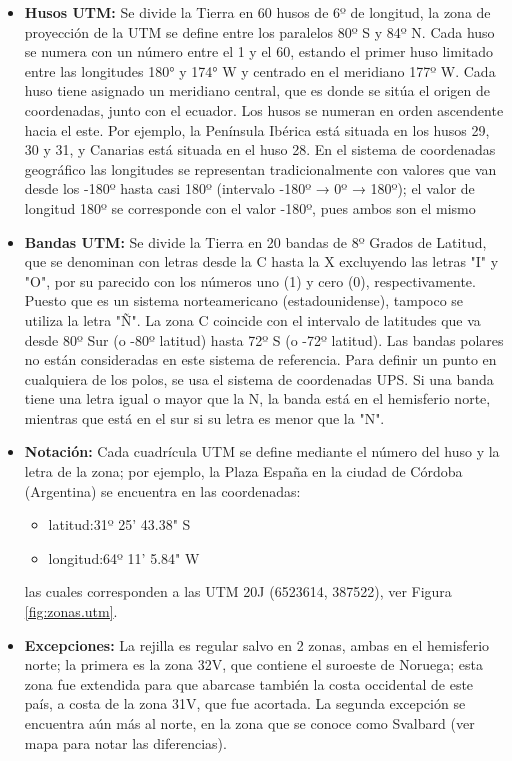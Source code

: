\documentclass[a4paper,12pt,twoside]{article}
\begin{document}
\begin{itemize}
	\item \textbf{  Husos UTM:}  Se divide la Tierra en 60 husos de 6º de longitud, la zona de
  proyección de la UTM se define entre los paralelos 80º S y 84º
  N. Cada huso se numera con un número entre el 1 y el 60, estando el
  primer huso limitado entre las longitudes 180° y 174° W y centrado
  en el meridiano 177º W. Cada huso tiene asignado un meridiano
  central, que es donde se sitúa el origen de coordenadas, junto con
  el ecuador. Los husos se numeran en orden ascendente hacia el
  este. Por ejemplo, la Península Ibérica está situada en los husos
  29, 30 y 31, y Canarias está situada en el huso 28. En el sistema de
  coordenadas geográfico las longitudes se representan
  tradicionalmente con valores que van desde los -180º hasta casi 180º
  (intervalo -180º → 0º → 180º); el valor de longitud 180º se
  corresponde con el valor -180º, pues ambos son el mismo

\item \textbf{Bandas UTM:}  Se divide la Tierra en 20 bandas de 8º Grados de Latitud, que se
  denominan con letras desde la C hasta la X excluyendo las letras "I"
  y "O", por su parecido con los números uno (1) y cero (0),
  respectivamente. Puesto que es un sistema norteamericano
  (estadounidense), tampoco se utiliza la letra "Ñ". La zona C
  coincide con el intervalo de latitudes que va desde 80º Sur (o -80º
  latitud) hasta 72º S (o -72º latitud). Las bandas polares no están
  consideradas en este sistema de referencia. Para definir un punto en
  cualquiera de los polos, se usa el sistema de coordenadas UPS. Si
  una banda tiene una letra igual o mayor que la N, la banda está en
  el hemisferio norte, mientras que está en el sur si su letra es
  menor que la "N".  

\item \textbf{Notación:} Cada cuadrícula UTM se define mediante el número del huso y la letra
  de la zona; por ejemplo, la Plaza España en la ciudad de C\'ordoba (Argentina) se encuentra en las coordenadas:
  \begin{itemize}
  \item latitud:31º 25' 43.38"  S
  \item longitud:64º 11' 5.84"  W
  \end{itemize}
  las cuales corresponden a las UTM 20J (6523614, 387522), ver Figura \ref{fig:zonas.utm}.  

\item \textbf{Excepciones:}  La rejilla es regular salvo en 2 zonas, ambas en el hemisferio
  norte; la primera es la zona 32V, que contiene el suroeste de
  Noruega; esta zona fue extendida para que abarcase también la costa
  occidental de este país, a costa de la zona 31V, que fue
  acortada. La segunda excepción se encuentra aún más al norte, en la
  zona que se conoce como Svalbard (ver mapa para notar las
  diferencias).
\end{itemize}
\end{document}
